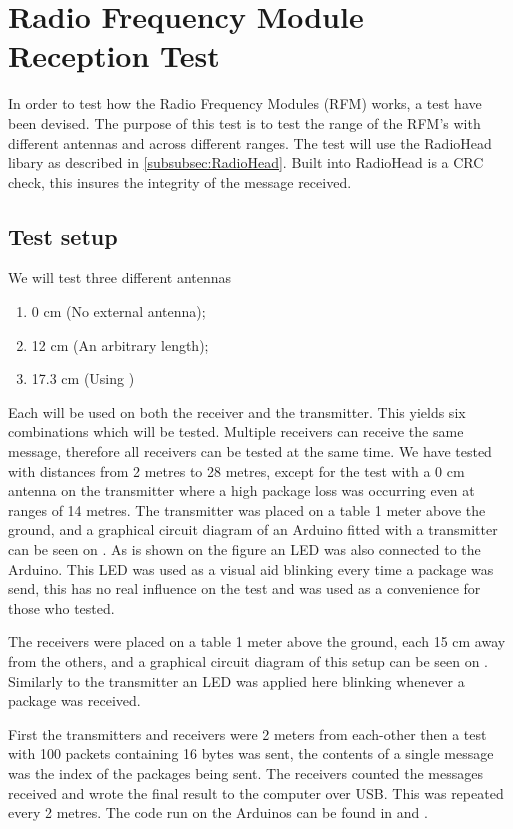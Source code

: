 \chapter{Radio Frequency Module Reception Test} %
\label{cha:radio_frequency_module_reception_test}
In order to test how the Radio Frequency Modules (RFM) works, a test have been devised. 
The purpose of this test is to test the range of the RFM's with different antennas and across different ranges. 
The test will use the RadioHead libary as described in \ref{subsubsec:RadioHead}. 
Built into RadioHead is a CRC check, this insures the integrity of the message received. 

\section*{Test setup}
We will test three different antennas 
\begin{enumerate}[label=\itshape \alph*\upshape)]
    \item 0 cm (No external antenna);
    \item 12 cm (An arbitrary length);
    \item 17.3 cm (Using )
\end{enumerate}
Each will be used on both the receiver and the transmitter. 
This yields six combinations which will be tested. 
Multiple receivers can receive the same message, therefore all receivers can be tested at the same time. 
We have tested with distances from 2 metres to 28 metres, except for the test with a 0 cm antenna on the transmitter where a high package loss was occurring even at ranges of 14 metres.
The transmitter was placed on a table 1 meter above the ground, and a graphical circuit diagram of an Arduino fitted with a transmitter can be seen on .
As is shown on the figure an LED was also connected to the Arduino.
This LED was used as a visual aid blinking every time a package was send, this has no real influence on the test and was used as a convenience for those who tested.

\noindent 
The receivers were placed on a table 1 meter above the ground, each 15 cm away from the others, and a graphical circuit diagram of this setup can be seen on .
Similarly to the transmitter an LED was applied here blinking whenever a package was received.

\noindent First the transmitters and receivers were 2 meters from each-other then a test with 100 packets containing 16 bytes was sent, the contents of a single message was the index of the packages being sent. 
The receivers counted the messages received and wrote the final result to the computer over USB. 
This was repeated every 2 metres. 
The code run on the Arduinos can be found in  and .

